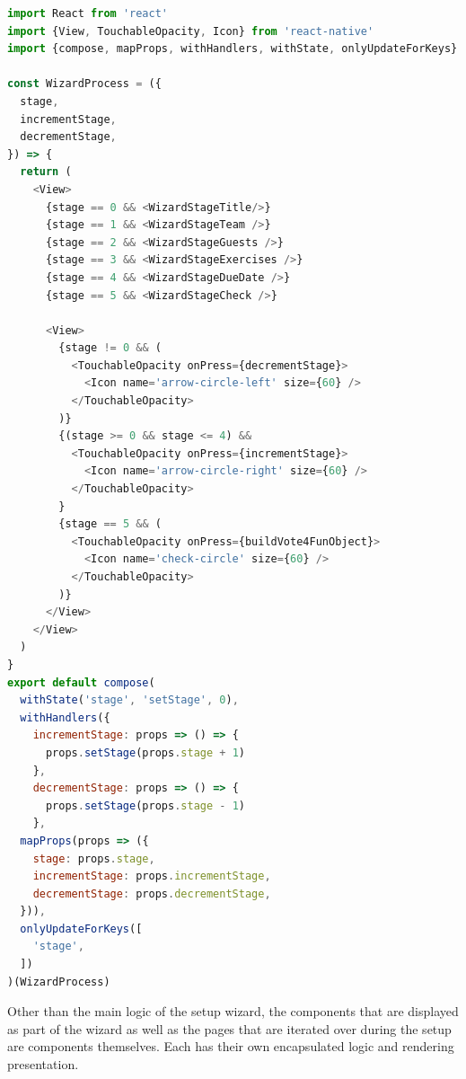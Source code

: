 \begin{lstlisting}[language=javascript,caption=Simplified Wizard \textit{React Native} Component using \textit{recompose},label=lst:componentWithRecompose]
import React from 'react'
import {View, TouchableOpacity, Icon} from 'react-native'
import {compose, mapProps, withHandlers, withState, onlyUpdateForKeys} from 'recompose'

const WizardProcess = ({
  stage,
  incrementStage,
  decrementStage,
}) => {
  return (
    <View>
      {stage == 0 && <WizardStageTitle/>}
      {stage == 1 && <WizardStageTeam />}
      {stage == 2 && <WizardStageGuests />}
      {stage == 3 && <WizardStageExercises />}
      {stage == 4 && <WizardStageDueDate />}
      {stage == 5 && <WizardStageCheck />}

      <View>
        {stage != 0 && (
          <TouchableOpacity onPress={decrementStage}>
            <Icon name='arrow-circle-left' size={60} />
          </TouchableOpacity>
        )}
        {(stage >= 0 && stage <= 4) &&
          <TouchableOpacity onPress={incrementStage}>
            <Icon name='arrow-circle-right' size={60} />
          </TouchableOpacity>
        }
        {stage == 5 && (
          <TouchableOpacity onPress={buildVote4FunObject}>
            <Icon name='check-circle' size={60} />
          </TouchableOpacity>
        )}
      </View>
    </View>
  )
}
export default compose(
  withState('stage', 'setStage', 0),
  withHandlers({
    incrementStage: props => () => {
      props.setStage(props.stage + 1)
    },
    decrementStage: props => () => {
      props.setStage(props.stage - 1)
    },
  mapProps(props => ({
    stage: props.stage,
    incrementStage: props.incrementStage,
    decrementStage: props.decrementStage,
  })),
  onlyUpdateForKeys([
    'stage',
  ])
)(WizardProcess)
\end{lstlisting}

Other than the main logic of the setup wizard, the components that are displayed as part of the wizard as well as the pages that are iterated over during the setup are components themselves. Each has their own encapsulated logic and rendering presentation.